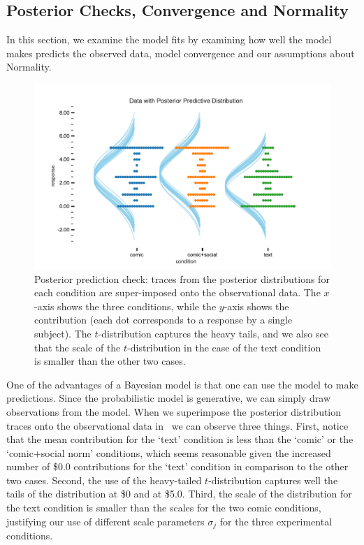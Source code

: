 \subsection{Posterior Checks, Convergence and Normality}
\label{sub:Posterior Checks, Convergence and Normality}

In this section, we examine the model fits by examining how well the model makes predicts the observed data, model convergence and our assumptions about Normality.

\begin{figure}[htb]
    \includegraphics[width=1\textwidth]{./hari-code/posterior_predictions.pdf}
    \caption{Posterior prediction check: traces from the posterior distributions for each condition are super-imposed onto the observational data. The $x$-axis shows the three conditions, while the $y$-axis shows the contribution (each dot corresponds to a response by a single subject). The $t$-distribution captures the heavy tails, and we also see that the scale of the $t$-distribution in the case of the text condition is smaller than the other two cases. }
    \label{fig:posteriorprediction}
\end{figure}

One of the advantages of a Bayesian model is that one can use the model to make predictions. Since the probabilistic model is generative, we can simply draw observations from the model. When we superimpose the posterior distribution traces onto the observational data in~ we can observe three things. First, notice that the mean contribution for the `text' condition is less than the `comic' or the `comic+social norm' conditions, which seems reasonable given the increased number of \$0.0 contributions for the `text' condition in comparison to the other two cases. Second, the use of the heavy-tailed $t$-distribution captures well the tails of the distribution at \$0 and at \$5.0. Third, the scale of the distribution for the text condition is smaller than the scales for the two comic conditions, justifying our use of different scale parameters $\sigma_j$ for the three experimental conditions.

